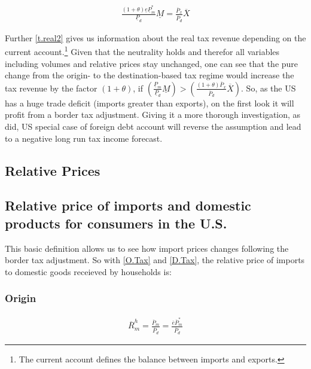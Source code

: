 \begin{equation}
    \begin{aligned}
        \frac{(1+\theta)\underline e \underline P_m^*}{\underline P_d}\underline M = \frac{\overline P_x}{\overline P_d} \overline X
    \end{aligned}
\end{equation}


Further \eqref{t.real2} gives us information about the real tax revenue depending on the current account.\footnote{The current account defines the balance between imports and exports. } Given that the neutrality holds and therefor all variables including volumes and relative prices stay unchanged, one can see that the pure change from the origin- to the destination-based tax regime would increase the tax revenue by the factor $(1+\theta)$, if $\left(\frac{\underline P_m}{\underline P_d} \underline M\right) > \left(\frac{ \left( 1+\theta \right) \overline P_x}{\overline P_d}\overline X\right) $. So, as the US has a huge trade deficit (imports greater than exports), on the first look it will profit from a border tax adjustment. Giving it a more thorough investigation, as \cite{Feldstein&Krugman} did, US special case of foreign debt account will reverse the assumption and lead to a negative long run tax income forecast.



\subsection*{Relative Prices}
\subsection*{Relative price of imports and domestic products for consumers in the U.S.}
This basic definition allows us to see how import prices changes following the border tax adjustment. So with \eqref{O.Tax} and \eqref{D.Tax}, the relative price of imports to domestic goods receieved by households is:
\subsubsection*{Origin}
\begin{equation}\label{mcon.o}
\begin{aligned}
\overline R^h_m = \frac{\overline P_m}{\overline P_d} = \frac{\overline e \overline P^*_m}{\overline P_d}
\end{aligned} 
\end{equation}

